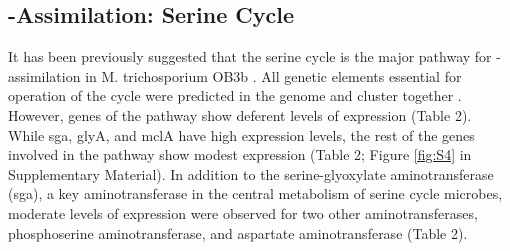 \subsection{-Assimilation: Serine Cycle}
It has been previously suggested that the serine cycle is the major pathway for -assimilation in M. trichosporium OB3b \cite{strom1974}.
All genetic elements essential for operation of the cycle were predicted in the genome and cluster together \cite{stein2010}.
However, genes of the pathway show deferent levels of expression (Table 2).
While sga, glyA, and mclA have high expression levels, the rest of the genes involved in the pathway show modest expression (Table 2; Figure \ref{fig:S4} in Supplementary Material).
In addition to the serine-glyoxylate aminotransferase (sga), a key aminotransferase in the central metabolism of serine cycle microbes, moderate levels of expression were observed for two other aminotransferases, phosphoserine aminotransferase, and aspartate aminotransferase (Table 2).

